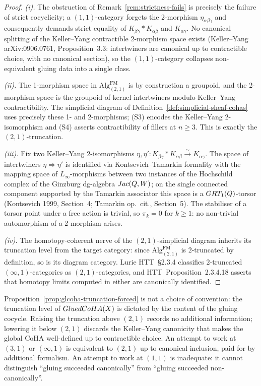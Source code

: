 \begin{proof}
\emph{(i).} The obstruction of Remark~\ref{rem:strictness-fails} is
precisely the failure of strict cocyclicity; a $(1,1)$-category
forgets the 2-morphism $\eta_{\alpha\beta\gamma}$ and consequently
demands strict equality of $K_{\beta\gamma} \ast K_{\alpha\beta}$
and $K_{\alpha\gamma}$. No canonical splitting of the Keller--Yang
contractible 2-morphism space exists (Keller--Yang arXiv:0906.0761,
Proposition~3.3: intertwiners are canonical up to contractible
choice, with no canonical section), so the $(1,1)$-category
collapses non-equivalent gluing data into a single class.

\emph{(ii).} The 1-morphism space in
$\mathrm{Alg}^{\mathrm{FM}}_{(2,1)}$ is by construction a groupoid,
and the 2-morphism space is the groupoid of kernel intertwiners
modulo Keller--Yang contractibility. The simplicial diagram of
Definition~\ref{def:simplicial-sheaf-cohas} uses precisely these
1- and 2-morphisms; (S3) encodes the Keller--Yang 2-isomorphism and
(S4) asserts contractibility of fillers at $n \geq 3$. This is
exactly the $(2,1)$-truncation.

\emph{(iii).} Fix two Keller--Yang 2-isomorphisms
$\eta, \eta': K_{\beta\gamma} \ast K_{\alpha\beta}
\xrightarrow{\sim} K_{\alpha\gamma}$. The space of intertwiners
$\eta \Rightarrow \eta'$ is identified via Kontsevich--Tamarkin
formality with the mapping space of $L_\infty$-morphisms between
two instances of the Hochschild complex of the Ginzburg dg-algebra
$Jac(Q, W)$; on the single connected component supported by the
Tamarkin associator this space is a $GRT_1(Q)$-torsor
(Kontsevich 1999, Section~4; Tamarkin op.~cit., Section~5). The
stabiliser of a torsor point under a free action is trivial, so
$\pi_k = 0$ for $k \geq 1$: no non-trivial automorphism of a
2-morphism arises.

\emph{(iv).} The homotopy-coherent nerve of the $(2,1)$-simplicial
diagram inherits its truncation level from the target category:
since $\mathrm{Alg}^{\mathrm{FM}}_{(2,1)}$ is 2-truncated by
definition, so is its diagram category. Lurie HTT~\S2.3.4 classifies
2-truncated $(\infty, 1)$-categories as $(2, 1)$-categories, and
HTT~Proposition~2.3.4.18 asserts that homotopy limits computed in
either are canonically identified.
\end{proof}

\begin{remark}
\label{rem:truncation-property-not-choice}
Proposition~\ref{prop:glcoha-truncation-forced} is not a choice of
convention: the truncation level of $GluedCoHA(X)$ is dictated by the
content of the gluing cocycle. Raising the truncation above
$(2,1)$ records no additional information; lowering it below
$(2,1)$ discards the Keller--Yang canonicity that makes the global
CoHA well-defined up to contractible choice. An attempt to work at
$(3,1)$ or $(\infty,1)$ is equivalent to $(2,1)$ up to canonical
inclusion, paid for by additional formalism. An attempt to work at
$(1,1)$ is inadequate: it cannot distinguish ``gluing succeeded
canonically'' from ``gluing succeeded non-canonically''.
\end{remark}

